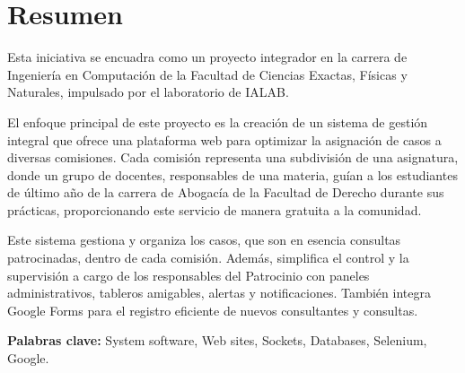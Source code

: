 \chapter*{Resumen}
Esta iniciativa se encuadra como un proyecto integrador en la carrera de Ingeniería en Computación de la Facultad de Ciencias Exactas, Físicas y Naturales, impulsado por el laboratorio de IALAB.

El enfoque principal de este proyecto es la creación de un sistema de gestión integral que ofrece una plataforma web para optimizar la asignación de casos a diversas comisiones. Cada comisión representa una subdivisión de una asignatura, donde un grupo de docentes, responsables de una materia, guían a los estudiantes de último año de la carrera de Abogacía de la Facultad de Derecho durante sus prácticas, proporcionando este servicio de manera gratuita a la comunidad.

Este sistema gestiona y organiza los casos, que son en esencia consultas patrocinadas, dentro de cada comisión. Además, simplifica el control y la supervisión a cargo de los responsables del Patrocinio con paneles administrativos, tableros amigables, alertas y notificaciones. También integra Google Forms para el registro eficiente de nuevos consultantes y consultas.

\vspace{.5cm}

\textbf{Palabras clave:} System software, Web sites, Sockets, Databases, Selenium, Google.